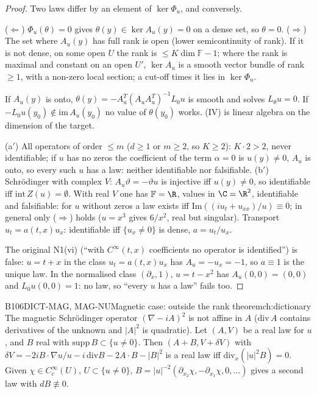 \begin{proof}
Two laws differ by an element of $\ker\Phi_u$, and conversely.

($\Leftarrow$) $\Phi_u(\theta)=0$ gives $\theta(y)\in\ker A_u(y)=0$ on a dense set, so $\theta=0$. ($\Rightarrow$) The set where $A_u(y)$ has full rank is open (lower semicontinuity of rank). If it is not dense, on some open $U$ the rank is $\le K\dim\mathbb F-1$; where the rank is maximal and constant on an open $U'$, $\ker A_u$ is a smooth vector bundle of rank $\ge1$, with a non-zero local section; a cut-off times it lies in $\ker\Phi_u$.

If $A_u(y)$ is onto, $\theta(y)=-A_u^T(A_uA_u^T)^{-1}L_0u$ is smooth and solves $L_\theta u=0$. If $-L_0u(y_0)\notin\mathrm{im}\,A_u(y_0)$ no value of $\theta(y_0)$ works. (IV) is linear algebra on the dimension of the target.

(a$'$) All operators of order $\le m$ ($d\ge1$ or $m\ge2$, so $K\ge2$): $K\cdot2>2$, never identifiable; if $u$ has no zeros the coefficient of the term $\alpha=0$ is $u(y)\neq0$, $A_u$ is onto, so every such $u$ has a law: neither identifiable nor falsifiable. (b$'$) Schrödinger with complex $V$: $A_u\vartheta=-\vartheta u$ is injective iff $u(y)\ne0$, so identifiable iff $\mathrm{int}\,Z(u)=\emptyset$. With real $V$ one has $\mathbb F=\R$, values in $\C=\R^2$, identifiable and falsifiable: for $u$ without zeros a law exists iff $\mathrm{Im}((iu_t+u_{xx})/u)\equiv0$; in general only ($\Rightarrow$) holds ($u=x^3$ gives $6/x^2$, real but singular). Transport $u_t=a(t,x)u_x$: identifiable iff $\{u_x\ne0\}$ is dense, $a=u_t/u_x$.

The original N1(vi) (``with $C^\infty(t,x)$ coefficients no operator is identified'') is false: $u=t+x$ in the class $u_t=a(t,x)u_x$ has $A_u=-u_x=-1$, so $a\equiv1$ is the unique law. In the normalised class $(\partial_x,1)$, $u=t-x^2$ has $A_u(0,0)=(0,0)$ and $L_0u(0,0)=1$: no law, so ``every $u$ has a law'' fails too.

\end{proof}

\begin{dimcard}{B106}{DICT-MAG, MAG-NU}{Magnetic case: outside the rank theorem}{\pw}{ch:dictionary}
The magnetic Schr\"odinger operator $(\nabla-iA)^2$ is not affine in $A$ ($\mathrm{div}\,A$ contains derivatives of the unknown and $|A|^2$ is quadratic). Let $(A,V)$ be a real law for $u$, and $B$ real with $\mathrm{supp}\,B\subset\{u\ne0\}$. Then $(A+B,V+\delta V)$ with $\delta V=-2iB\cdot\nabla u/u-i\,\mathrm{div}B-2A\cdot B-|B|^2$ is a real law iff $\mathrm{div}_x(|u|^2B)=0$. Given $\chi\in C^\infty_c(U)$, $U\subset\{u\ne0\}$, $B=|u|^{-2}(\partial_{x_2}\chi,-\partial_{x_1}\chi,0,\dots)$ gives a second law with $dB\not\equiv0$.
\end{dimcard}

